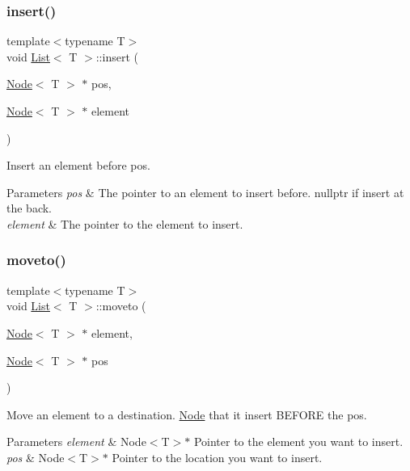 \subsubsection{\texorpdfstring{insert()}{insert()}\hspace{0.1cm}{\footnotesize\ttfamily [2/2]}}
{\footnotesize\ttfamily template$<$typename T$>$ \\
void \hyperlink{classList}{List}$<$ T $>$\+::insert (\begin{DoxyParamCaption}\item[{\hyperlink{structNode}{Node}$<$ T $>$ $\ast$}]{pos,  }\item[{\hyperlink{structNode}{Node}$<$ T $>$ $\ast$}]{element }\end{DoxyParamCaption})\hspace{0.3cm}{\ttfamily [inline]}}



Insert an element before pos. 


\begin{DoxyParams}{Parameters}
{\em pos} & The pointer to an element to insert before. nullptr if insert at the back. \\
\hline
{\em element} & The pointer to the element to insert. \\
\hline
\end{DoxyParams}
\mbox{\label{classList_a5bfb723e873c6af1e03b085a24ad62f4}} 
\subsubsection{\texorpdfstring{moveto()}{moveto()}}
{\footnotesize\ttfamily template$<$typename T$>$ \\
void \hyperlink{classList}{List}$<$ T $>$\+::moveto (\begin{DoxyParamCaption}\item[{\hyperlink{structNode}{Node}$<$ T $>$ $\ast$}]{element,  }\item[{\hyperlink{structNode}{Node}$<$ T $>$ $\ast$}]{pos }\end{DoxyParamCaption})\hspace{0.3cm}{\ttfamily [inline]}}



Move an element to a destination. \hyperlink{structNode}{Node} that it insert B\+E\+F\+O\+RE the pos. 


\begin{DoxyParams}{Parameters}
{\em element} & Node$<$\+T$>$$\ast$ Pointer to the element you want to insert. \\
\hline
{\em pos} & Node$<$\+T$>$$\ast$ Pointer to the location you want to insert.\\
\hline
\end{DoxyParams}

